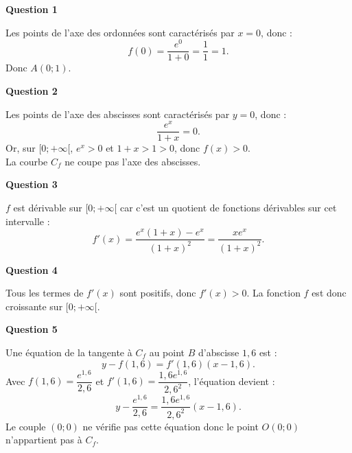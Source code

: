 \textbf{Question 1}
	
	Les points de l’axe des ordonnées sont caractérisés par $x = 0$, donc :
	\[
	f(0) = \dfrac{e^0}{1+0} = \dfrac{1}{1} = 1.
	\]
	Donc $A(0;1)$.
	
	\textbf{Question 2}
	
	Les points de l’axe des abscisses sont caractérisés par $y = 0$, donc :
	\[
	\dfrac{e^x}{1 + x} = 0.
	\]
	Or, sur $[0; +\infty[$, $e^x > 0$ et $1 + x > 1 > 0$, donc $f(x) > 0$.\\
	 La courbe $C_f$ ne coupe pas l'axe des abscisses.
	
	\textbf{Question 3}
	
	$f$ est dérivable sur $[0; +\infty[$ car c’est un quotient de fonctions dérivables sur cet intervalle :
	\[
	f'(x) = \dfrac{e^x(1 + x) - e^x}{(1 + x)^2} = \dfrac{x e^x}{(1 + x)^2}.
	\]
	
	\textbf{Question 4}
	
	Tous les termes de $f'(x)$ sont positifs, donc $f'(x) > 0$. La fonction $f$ est donc croissante sur $[0; +\infty[$.
	
	\textbf{Question 5}
	
	Une équation de la tangente à $C_f$ au point $B$ d’abscisse $1,6$ est :
	\[
	y - f(1,6) = f'(1,6)(x - 1,6).
	\]
	Avec $f(1,6) = \dfrac{e^{1,6}}{2,6}$ et $f'(1,6) = \dfrac{1,6 e^{1,6}}{2,6^2}$, l'équation devient :
	\[
	y - \dfrac{e^{1,6}}{2,6} = \dfrac{1,6 e^{1,6}}{2,6^2}(x - 1,6).
	\]
Le couple $(0;0)$ ne vérifie pas cette équation donc le point $O(0; 0)$ n'appartient pas à $C_f$.
